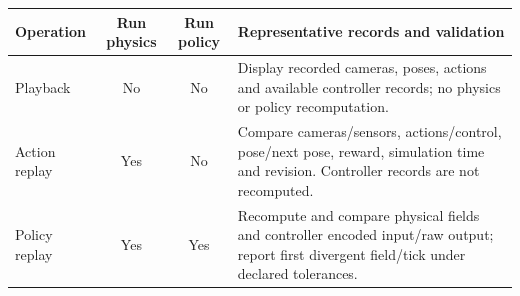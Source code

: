 \renewcommand{\arraystretch}{1.3}
\begin{tabularx}{\linewidth}{@{}l c c X@{}}
\toprule
Operation & Run physics & Run policy & Representative records and validation\\
\midrule
Playback & No & No & Display recorded cameras, poses, actions and available controller records; no physics or policy recomputation.\\
Action replay & Yes & No & Compare cameras/sensors, actions/control, pose/next pose, reward, simulation time and revision. Controller records are not recomputed.\\
Policy replay & Yes & Yes & Recompute and compare physical fields and controller encoded input/raw output; report first divergent field/tick under declared tolerances.\\
\bottomrule
\end{tabularx}
